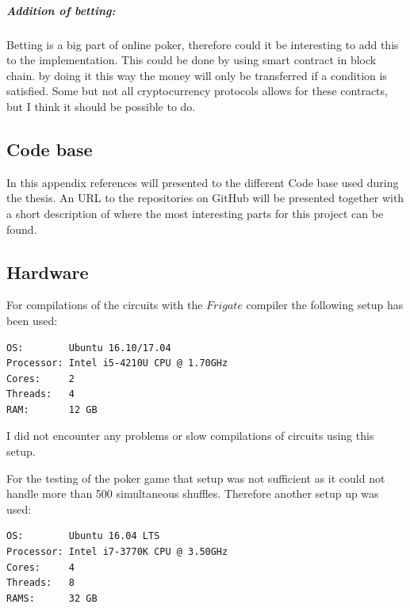 \documentclass[twoside,11pt,openright]{report}
\begin{document}
\paragraph{Addition of betting:}
Betting is a big part of online poker, therefore could it be interesting to add this to the implementation. This could be done by using smart contract in block chain. by doing it this way the money will only be transferred if a condition is satisfied. Some but not all cryptocurrency protocols allows for these contracts, but I think it should be possible to do.



\begin{appendices}
\chapter{Code base}
In this appendix references will presented to the different Code base used during the thesis. An URL to the repositories on GitHub will be presented together with a short description of where the most interesting parts for this project can be found.

\section{Hardware}
\label{app:hardware}
For compilations of the circuits with the $Frigate$ compiler the following setup has been used:

\begin{center}
\begin{verbatim}
OS:        Ubuntu 16.10/17.04
Processor: Intel i5-4210U CPU @ 1.70GHz
Cores:     2
Threads:   4
RAM:       12 GB
\end{verbatim}
\end{center}

I did not encounter any problems or slow compilations of circuits using this setup.

\bigskip
For the testing of the poker game that setup was not sufficient as it could not handle more than 500 simultaneous shuffles. Therefore another setup up was used:

\begin{center}
\begin{verbatim}
OS:        Ubuntu 16.04 LTS
Processor: Intel i7-3770K CPU @ 3.50GHz
Cores:     4
Threads:   8
RAMS:      32 GB
\end{verbatim}
\end{center}


\end{appendices}
\end{document}
